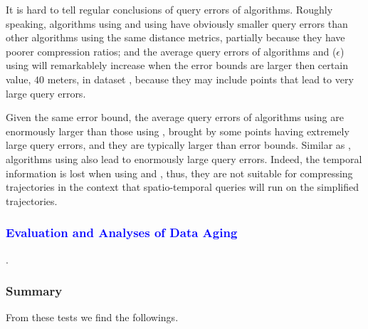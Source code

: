 It is hard to tell regular conclusions of query errors of \lsa algorithms. Roughly speaking, algorithms \intersec using \dad and \squishe using \sed have obviously smaller query errors than other algorithms using the same distance metrics, partially because they have poorer compression ratios; and the average query errors of algorithms \operb and \siped($\epsilon$) using \ped will remarkablely increase when the error bounds are larger then certain value, \eg $40$ meters, in dataset \mopsi, because they may include points that lead to very large query errors. 





Given the same error bound, the average query errors of algorithms using \ped are enormously larger than those using \sed, brought by some points having extremely large query errors, and they are typically larger than error bounds. 
Similar as \ped, algorithms using \dad also lead to enormously large query errors. 
Indeed, the temporal information is lost when using \ped and \dad, thus, they are not suitable for compressing trajectories in the context that spatio-temporal queries will run on the simplified trajectories.



\subsubsection{\textcolor{blue}{Evaluation and Analyses of Data Aging}}
\todo.

\subsubsection{Summary}
From these tests we find the followings.

